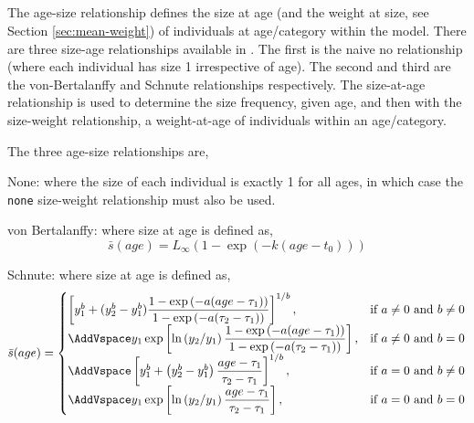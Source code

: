 \subsection{\label{sec:size-at-age}}

The age-size relationship defines the size at age (and the weight at size, see Section \ref{sec:mean-weight}) of individuals at age/category within the model. There are three size-age relationships available in \CAS. The first is the naive no relationship (where each individual has size 1 irrespective of age). The second  and third are the von-Bertalanffy and Schnute relationships respectively. The size-at-age relationship is used to determine the size frequency, given age, and then with the size-weight relationship, a weight-at-age of individuals within an age/category. 

The three age-size relationships are,

\begin{description}
\item {None:} where the size of each individual is exactly 1 for all ages, in which case the \texttt{none} size-weight relationship must also be used.
\item{von Bertalanffy:} where size at age is defined as,
\begin{equation} 
\bar{s}(age)= L_\infty \left( 1 - \exp \left( -k \left(age-t_0 \right) \right) \right)
\end{equation}

\item{Schnute:} where size at age is defined as,
\begin{equation}
\bar{s}(age)=\displaystyle\begin{cases}
  \left[ y_1^b + (y_2^b - y_1^b) \dfrac{1-\exp \left(-a(age - \tau_1) \right)}{1-\exp \left(-a(\tau_2 - \tau_1) \right)} \right]^{1/b}, & \text{if $a\ne0$ and $b\ne0$} \\
  \AddVspace
  y_1 \exp \left[ \ln \left( y_2 / y_1 \right) \dfrac{1-\exp \left(-a(age - \tau_1) \right)}{1-\exp \left(-a(\tau_2 - \tau_1) \right)} \right], & \text{if $a\ne0$ and $b=0$} \\
  \AddVspace
  \left[ y_1^b + \left( y_2^b - y_1^b \right) \dfrac{age-\tau_1}{\tau_2 - \tau_1} \right]^{1/b}, & \text{if $a=0$ and $b\ne0$} \\
  \AddVspace
  y_1 \exp \left[ \ln \left( y_2/y_1 \right) \dfrac{age-\tau_1}{\tau_2 - \tau_1} \right] , & \text{if $a=0$ and $b=0$} \\
  \end{cases}
\end{equation}
\end{description}


